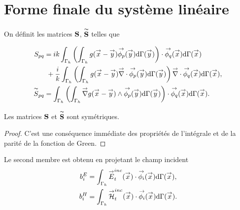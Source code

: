 
\section{Forme finale du système linéaire}

  \begin{defn}
    On définit les matrices \(\mS\), \(\mSt\) telles que

    \begin{align*}
      S_{pq}
        &= ik \int_{\Gamma_h} \left( \int_{\Gamma_h} g(\vx - \vy) \phip(\vy) \dd{\Gamma}(\vy) \right) \cdot \phiq (\vx)\dd{\Gamma}(\vx)\\
        \notag&~+ \frac{i}{k}\int_{\Gamma_h} \left( \int_{\Gamma_h} g(\vx - \vy) \vdiv \phip (\vy) \dd{\Gamma}(\vy) \right) \vdiv \phiq(\vx) \dd{\Gamma}(\vx),
      \\
      \tilde{S}_{pq}
        &= \int_{\Gamma_h} \left( \int_{\Gamma_h} \vgrad g(\vx - \vy) \pvect \phip(\vy) \dd{\Gamma}(\vy) \right) \cdot \phiq(\vx) \dd{\Gamma}(\vx).
    \end{align*}
  \end{defn}

  \begin{prop}
    Les matrices \(\mS\) et \(\mSt\) sont symétriques.
  \end{prop}
  \begin{proof}
    C'est une conséquence immédiate des propriétés de l'intégrale et de la parité de la fonction de Green.
  \end{proof}

  Le second membre est obtenu en projetant le champ incident
    \begin{align*}
      b_i^E &= \int_{\Gamma_h} \vE_t^{inc}(\vx) \cdot \phii(\vx)\dd{\Gamma}(\vx), \\
      b_i^H &= \int_{\Gamma_h} \vH_t^{inc}(\vx) \cdot \phii(\vx)\dd{\Gamma}(\vx).
    \end{align*}

